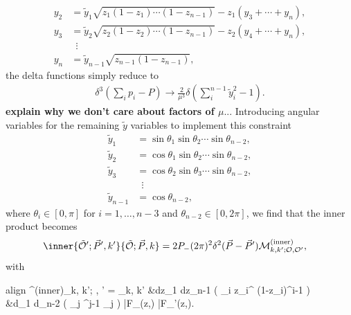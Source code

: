 {\begin{equation}
\begin{aligned}
			y_2 &= \tilde{y}_1 \sqrt{z_1(1-z_1) \dotsb (1-z_{n-1})} - z_1(y_3 + \dotsb + y_n), \\
			y_3 &= \tilde{y}_2 \sqrt{z_2(1-z_2) \dotsb (1-z_{n-1})} - z_2(y_4 + \dotsb + y_n), \\
			& \, \, \, \vdots\\
			y_n &= \tilde{y}_{n-1} \sqrt{z_{n-1}(1-z_{n-1})}, \label{ytrans}
		\end{aligned}
	\end{equation} the delta functions simply reduce to \begin{equation}
		\begin{aligned}
			\delta^3\left(\sum_i p_i - P \right) \to \frac{2}{\mu^3} \delta \left( \sum_i^{n-1} \tilde{y}_i^2 - 1 \right).
		\end{aligned}
	\end{equation} {\color{red}\textbf{explain why we don't care about factors of $\mu$}...} Introducing angular variables for the remaining $\tilde{y}$ variables to implement this constraint \begin{equation}
		\begin{aligned}
			\tilde{y}_1 &= \sin \theta_1 \sin \theta_2 \dotsb \sin \theta_{n-2}, \\
			\tilde{y}_2 &= \cos \theta_1 \sin \theta_2 \dotsb \sin \theta_{n-2}, \\
			\tilde{y}_3 &= \cos \theta_2 \sin \theta_3 \dotsb \sin \theta_{n-2}, \\
			&\, \, \, \vdots \\
			\tilde{y}_{n-1} &= \cos \theta_{n-2}, \label{thetatrans}
		\end{aligned}
	\end{equation} where $\theta_i \in [0, \pi]$ for $i = 1, \dots, n-3$ and $\theta_{n-2} \in [0, 2\pi]$, we find that the inner product becomes \begin{equation}
		\begin{aligned}
			\inner{\tilde{\CO}';\vec{P}', k'}{\tilde{\CO};\vec{P}, k} &= 2 P_- (2\pi)^2 \delta^2(\vec{P}-\vec{P}') \Mcal^{\textrm{(inner)}}_{k, k'; \Ocal, \Ocal'},
		\end{aligned}
	\end{equation} with 
		\begin{empheq}[box=\fbox]{align}
			\Mcal^{\textrm{(inner)}}_{k, k'; \Ocal, \Ocal'} = \delta_{k, k'}  &\int dz_1 \dotsb dz_{n-1} \left( \prod_i z_i^{} (1-z_i)^{i-1} \right) \nonumber \\
			&\times \int d\theta_1 \dotsb d\theta_{n-2} \left( \prod_j \sin^{j-1} \theta_j \right) \bar{F}_{\Ocal}(z,\theta) \bar{F}_{\Ocal'}(z,\theta). \label{inner}
		\end{empheq}


}

